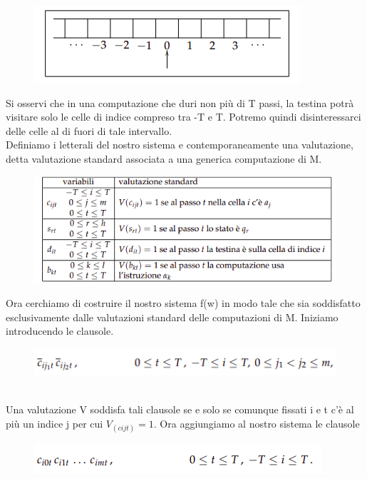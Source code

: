 \begin{figure}[htp]
    \centering
    \includegraphics[scale=0.6]{tesi_stile/img/levin1.png}
\end{figure}
Si osservi che in una computazione che duri non più di T passi, la testina potrà
visitare solo le celle di indice compreso tra -T e T. Potremo quindi disinteressarci delle celle al di fuori di tale intervallo.
\\Definiamo i letterali del nostro sistema e contemporaneamente una valutazione, detta valutazione standard associata a una generica computazione di M.
\begin{figure}[htp]
    \centering
    \includegraphics[scale=0.6]{tesi_stile/img/levin2.png}
\end{figure}
Ora cerchiamo di costruire il nostro sistema f(w) in modo tale che sia soddisfatto
esclusivamente dalle valutazioni standard delle computazioni di M. Iniziamo introducendo le clausole.
\begin{figure}[htp]
    \centering
    \includegraphics[scale=0.6]{tesi_stile/img/levin3.png}
\end{figure}
\\Una valutazione V soddisfa tali clausole se e solo se comunque fissati i e t c’è al più un indice j per cui $V_{(cijt)} = 1$. 
\newpage
Ora aggiungiamo al nostro sistema le clausole
\begin{figure}[htp]
    \centering
    \includegraphics[scale=0.6]{tesi_stile/img/levin4.png}
\end{figure}
